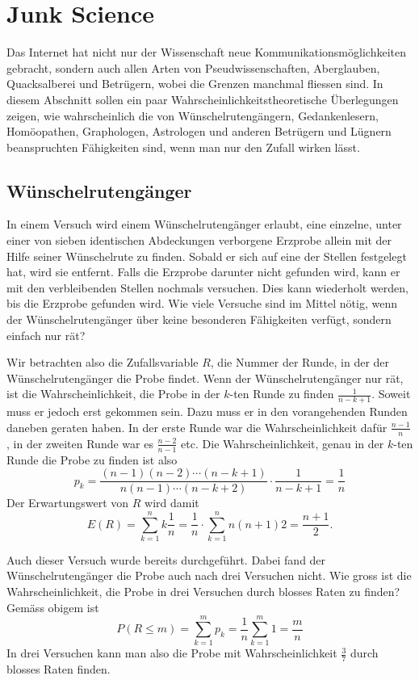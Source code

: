 %
%
%
\chapter{Junk Science}
Das Internet hat nicht nur der Wissenschaft neue Kommunikationsmöglichkeiten
gebracht, sondern auch allen Arten von Pseudwissenschaften,
Aberglauben, Quacksalberei und Betrügern, wobei die Grenzen manchmal
fliessen sind.
In diesem Abschnitt sollen ein paar Wahrscheinlichkeitstheoretische
Überlegungen zeigen, wie wahrscheinlich die von Wünschelrutengängern,
Gedankenlesern, Homöo\-pathen, Graphologen, Astrologen und anderen Betrügern
und Lügnern beanspruchten Fähigkeiten sind, wenn man nur den Zufall wirken
lässt.

\section{Wünschelrutengänger}
In einem Versuch wird einem Wünschelrutengänger erlaubt, eine einzelne,
unter einer von sieben identischen Abdeckungen verborgene Erzprobe allein
mit der Hilfe seiner Wünschelrute zu finden.
Sobald er sich auf eine
der Stellen festgelegt hat, wird sie entfernt.
Falls die Erzprobe darunter
nicht gefunden wird, kann er mit den verbleibenden Stellen nochmals
versuchen.
Dies kann wiederholt werden, bis die Erzprobe gefunden wird.
Wie viele Versuche sind im Mittel nötig, wenn der Wünschelrutengänger
über keine besonderen Fähigkeiten verfügt, sondern einfach nur rät?

Wir betrachten also die Zufallsvariable $R$, die Nummer der Runde, in der
der Wünschelrutengänger die Probe findet.
Wenn der Wünschelrutengänger
nur rät, ist die Wahrscheinlichkeit, die Probe in der $k$-ten Runde zu finden
$\frac1{n-k+1}$.
Soweit muss er jedoch erst gekommen sein.
Dazu muss er in
den vorangehenden Runden daneben geraten haben.
In der erste
Runde war die Wahrscheinlichkeit dafür $\frac{n-1}n$, in der zweiten
Runde war es $\frac{n-2}{n-1}$ etc.
Die Wahrscheinlichkeit, genau in der
$k$-ten Runde die Probe zu finden ist also
\[
p_k=\frac{(n-1)(n-2)\cdots (n-k+1)}{n(n-1)\cdots(n-k+2)}\cdot\frac1{n-k+1}=\frac1n
\]
Der Erwartungswert von $R$ wird damit
\[
E(R)=\sum_{k=1}^nk\frac1n=\frac1n\cdot\sum_{k=1}^n{n(n+1)}2=\frac{n+1}2.
\]

Auch dieser Versuch wurde bereits durchgeführt.
Dabei fand der Wünschelrutengänger
die Probe auch nach drei Versuchen nicht.
Wie gross ist die Wahrscheinlichkeit,
die Probe in drei Versuchen durch blosses Raten zu finden? Gemäss obigem ist
$$P(R\le m)= \sum_{k=1}^mp_k=\frac1n\sum_{k=1}^m1=\frac{m}{n}$$
In drei Versuchen kann man also die Probe mit Wahrscheinlichkeit $\frac37$ durch
blosses Raten finden.

